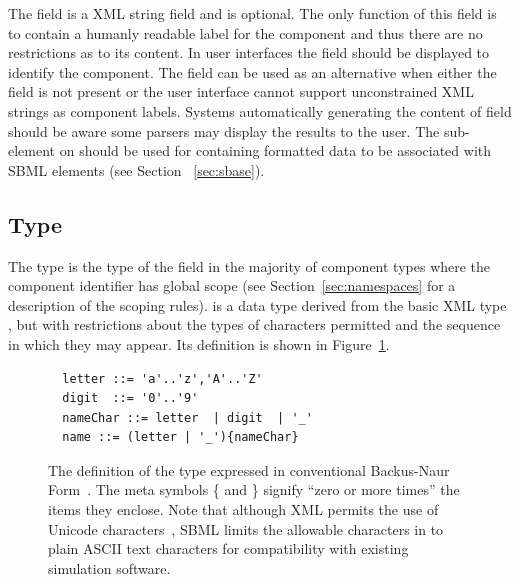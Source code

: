 \documentclass[10pt]{cekarticle}
\newcommand{\vref}[1]{\ref{#1}}
\begin{document}
The  field is a XML string field and is optional. The
only function of this field is to contain a humanly readable label
for the component and thus there are no restrictions as to its
content.  In user interfaces the  field should be
displayed to identify the component.  The  field can be
used as an alternative when either the  field is not
present or the user interface cannot support unconstrained XML
strings as component labels.  Systems automatically generating the
content of  field should be aware some parsers may
display the results to the user.  The  sub-element
on  should be used for containing formatted data to
be associated with SBML elements (see Section ~\ref{sec:sbase}).

\subsection{Type }
\label{sec:id}

The type  is the type of the  field in the
majority of component types where the component identifier has
global scope (see Section~\ref{sec:namespaces} for a description
of the scoping rules).  is a data type derived from the
basic XML type , but with restrictions about the
types of characters permitted and the sequence in which they may
appear. Its definition is shown in Figure~\vref{fig:id}.

\begin{figure}[th]
  \vspace*{10pt}
  \centering
  \begin{minipage}{3.8in}
\begin{verbatim}
  letter ::= 'a'..'z','A'..'Z'
  digit  ::= '0'..'9'
  nameChar ::= letter  | digit  | '_'
  name ::= (letter | '_'){nameChar}
\end{verbatim}
  \end{minipage}
  \caption{The definition of the type  expressed in conventional
    Backus-Naur Form~\protect\citep{naur:1960}.  The meta symbols \{ and \} signify
    ``zero or more times'' the items they enclose.  Note that although XML
    permits the use of Unicode characters~\protect\citep{unicode:1996}, SBML
    limits the allowable characters in  to plain ASCII text
    characters for compatibility with existing simulation software.}
  \label{fig:id}
\end{figure}
\end{document}
